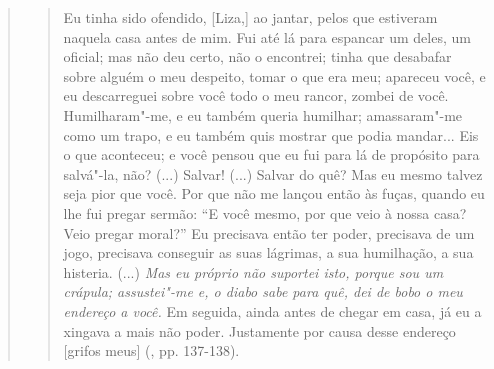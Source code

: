 {\begin{quote}
\begin{quote}
Eu tinha sido ofendido, {[}Liza,{]} ao jantar, pelos que estiveram
naquela casa antes de mim. Fui até lá para espancar um deles, um
oficial; mas não deu certo, não o encontrei; tinha que desabafar sobre
alguém o meu despeito, tomar o que era meu; apareceu você, e eu
descarreguei sobre você todo o meu rancor, zombei de você.
Humilharam"-me, e eu também queria humilhar; amassaram"-me como um trapo,
e eu também quis mostrar que podia mandar... Eis o que aconteceu; e você
pensou que eu fui para lá de propósito para salvá"-la, não? (...) Salvar!
(...) Salvar do quê? Mas eu mesmo talvez seja pior que você. Por que não
me lançou então às fuças, quando eu lhe fui pregar sermão: ``E você
mesmo, por que veio à nossa casa? Veio pregar moral?'' Eu precisava
então ter poder, precisava de um jogo, precisava conseguir as suas
lágrimas, a sua humilhação, a sua histeria. (...) \emph{Mas eu próprio
não suportei isto, porque sou um crápula; assustei"-me e, o diabo sabe
para quê, dei de bobo o meu endereço a você.} Em seguida, ainda antes de
chegar em casa, já eu a xingava a mais não poder. Justamente por causa
desse endereço {[}grifos meus{]} (, pp. 137-138).
\end{quote}


\end{quote}}
